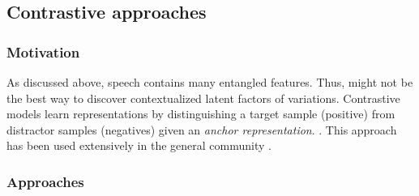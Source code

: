 









\subsection{Contrastive approaches}
\label{contrastive_approaches}
\subsubsection{Motivation}
As discussed above, speech contains many entangled features. Thus,  might not be the best way to discover contextualized latent factors of variations. 
Contrastive models learn representations by distinguishing a target sample (positive) from distractor samples (negatives) given an \emph{anchor representation}. . This approach has been used extensively in the general  community \cite{Schultz_Joachims_NeurIPS2004}.

\subsubsection{Approaches}
